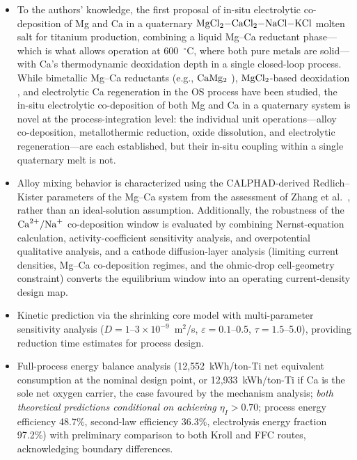 \documentclass[11pt]{article}
\begin{document}
\begin{itemize}
\item To the authors' knowledge, the first proposal of in-situ electrolytic co-deposition of Mg and Ca in a quaternary $\ce{MgCl2-CaCl2-NaCl-KCl}$ molten salt for titanium production, combining a liquid Mg--Ca reductant phase---which is what allows operation at 600~$^{\circ}$C, where both pure metals are solid---with Ca's thermodynamic deoxidation depth in a single closed-loop process. While bimetallic Mg--Ca reductants (e.g., $\ce{CaMg2}$ \cite{lee2025}), $\ce{MgCl2}$-based deoxidation \cite{taninouchi2016}, and electrolytic Ca regeneration in the OS process \cite{ono2002} have been studied, the in-situ electrolytic co-deposition of both Mg and Ca in a quaternary system is novel at the process-integration level: the individual unit operations---alloy co-deposition, metallothermic reduction, oxide dissolution, and electrolytic regeneration---are each established, but their in-situ coupling within a single quaternary melt is not.
\item Alloy mixing behavior is characterized using the CALPHAD-derived Redlich--Kister parameters of the Mg--Ca system from the assessment of Zhang et al.\ \cite{zhang2008mgce}, rather than an ideal-solution assumption. Additionally, the robustness of the $\ce{Ca^{2+}/Na+}$ co-deposition window is evaluated by combining Nernst-equation calculation, activity-coefficient sensitivity analysis, and overpotential qualitative analysis, and a cathode diffusion-layer analysis (limiting current densities, Mg--Ca co-deposition regimes, and the ohmic-drop cell-geometry constraint) converts the equilibrium window into an operating current-density design map.
\item Kinetic prediction via the shrinking core model with multi-parameter sensitivity analysis ($D = 1$--$3\times10^{-9}$~m$^2$/s, $\varepsilon = 0.1$--0.5, $\tau = 1.5$--5.0), providing reduction time estimates for process design.
\item Full-process energy balance analysis (12{,}552~kWh/ton-Ti net equivalent consumption at the nominal design point, or 12{,}933~kWh/ton-Ti if Ca is the sole net oxygen carrier, the case favoured by the mechanism analysis; \emph{both theoretical predictions conditional on achieving $\eta_I > 0.70$}; process energy efficiency 48.7\%, second-law efficiency 36.3\%, electrolysis energy fraction 97.2\%) with preliminary comparison to both Kroll and FFC routes, acknowledging boundary differences.
\end{itemize}
\end{document}
